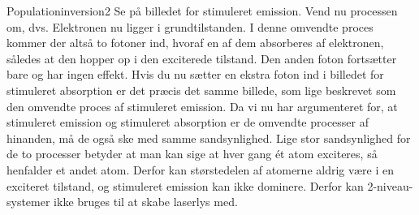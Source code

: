 \begin{opgave}{Populationinversion}{2}
\opg Se på billedet for stimuleret emission. Vend nu processen om, dvs. Elektronen nu ligger i grundtilstanden. I denne omvendte proces kommer der altså to fotoner ind, hvoraf en af dem absorberes af elektronen, således at den hopper op i den exciterede tilstand. Den anden foton fortsætter bare og har ingen effekt. Hvis du nu sætter en ekstra foton ind i billedet for stimuleret absorption er det præcis det samme billede, som lige beskrevet som den omvendte proces af stimuleret emission. 
\opg Da vi nu har argumenteret for, at stimuleret emission og stimuleret absorption er de omvendte processer af hinanden, må de også ske med samme sandsynlighed.  Lige stor sandsynlighed for de to processer betyder at man kan sige at hver gang ét atom exciteres, så henfalder et andet atom. Derfor kan størstedelen af atomerne aldrig være i en exciteret tilstand, og stimuleret emission kan ikke dominere. Derfor kan 2-niveau-systemer ikke bruges til at skabe laserlys med.
\end{opgave}

